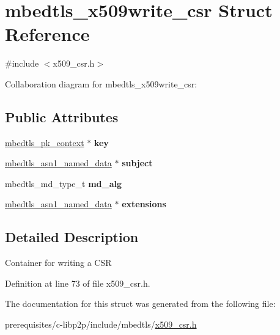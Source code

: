 \hypertarget{structmbedtls__x509write__csr}{}\section{mbedtls\+\_\+x509write\+\_\+csr Struct Reference}
\label{structmbedtls__x509write__csr}


{\ttfamily \#include $<$x509\+\_\+csr.\+h$>$}



Collaboration diagram for mbedtls\+\_\+x509write\+\_\+csr\+:
\subsection*{Public Attributes}
\begin{DoxyCompactItemize}
\item 
\mbox{\label{structmbedtls__x509write__csr_aa11f0d0cf8328a8fac96047e48185e34}} 
\mbox{\hyperlink{structmbedtls__pk__context}{mbedtls\+\_\+pk\+\_\+context}} $\ast$ {\bfseries key}
\item 
\mbox{\label{structmbedtls__x509write__csr_affac2ecd0e1cbb03475e14712b0f1cb7}} 
\mbox{\hyperlink{structmbedtls__asn1__named__data}{mbedtls\+\_\+asn1\+\_\+named\+\_\+data}} $\ast$ {\bfseries subject}
\item 
\mbox{\label{structmbedtls__x509write__csr_a6ab29632c7e1af29696b739ade6ba2ea}} 
mbedtls\+\_\+md\+\_\+type\+\_\+t {\bfseries md\+\_\+alg}
\item 
\mbox{\label{structmbedtls__x509write__csr_ad90011b91ca8e73856511006f93a6a27}} 
\mbox{\hyperlink{structmbedtls__asn1__named__data}{mbedtls\+\_\+asn1\+\_\+named\+\_\+data}} $\ast$ {\bfseries extensions}
\end{DoxyCompactItemize}


\subsection{Detailed Description}
Container for writing a C\+SR 

Definition at line 73 of file x509\+\_\+csr.\+h.



The documentation for this struct was generated from the following file\+:\begin{DoxyCompactItemize}
\item 
prerequisites/c-\/libp2p/include/mbedtls/\mbox{\hyperlink{x509__csr_8h}{x509\+\_\+csr.\+h}}\end{DoxyCompactItemize}
